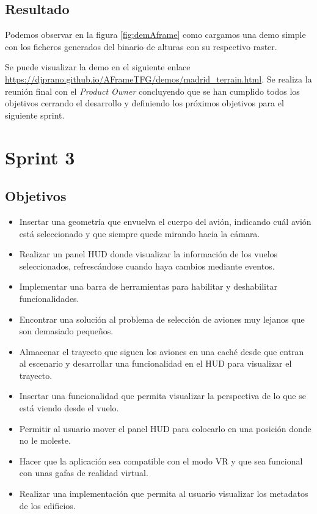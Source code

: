\documentclass[a4paper, 11pt]{book}
\begin{document}
\subsection{Resultado}
Podemos observar en la figura \ref{fig:demAframe} como cargamos una demo simple con los ficheros generados del binario de alturas con su respectivo raster. 

Se puede visualizar la demo en el siguiente enlace \url{https://djprano.github.io/AFrameTFG/demos/madrid_terrain.html}.
Se realiza la reunión final con el \emph{Product Owner} concluyendo que se han cumplido todos los objetivos cerrando el desarrollo y definiendo los próximos objetivos para el siguiente sprint.
\section{Sprint 3}
\subsection{Objetivos}
\begin{itemize}
    \item Insertar una geometría que envuelva el cuerpo del avión, indicando cuál avión está seleccionado y que siempre quede mirando hacia la cámara.
    \item Realizar un panel HUD donde visualizar la información de los vuelos seleccionados, refrescándose cuando haya cambios mediante eventos.
    \item Implementar una barra de herramientas para habilitar y deshabilitar funcionalidades.
    \item Encontrar una solución al problema de selección de aviones muy lejanos que son demasiado pequeños.
    \item Almacenar el trayecto que siguen los aviones en una caché desde que entran al escenario y desarrollar una funcionalidad en el HUD para visualizar el trayecto.
    \item Insertar una funcionalidad que permita visualizar la perspectiva de lo que se está viendo desde el vuelo.
    \item Permitir al usuario mover el panel HUD para colocarlo en una posición donde no le moleste.
    \item Hacer que la aplicación sea compatible con el modo VR y que sea funcional con unas gafas de realidad virtual.
    \item Realizar una implementación que permita al usuario visualizar los metadatos de los edificios.
\end{itemize}
\end{document}

